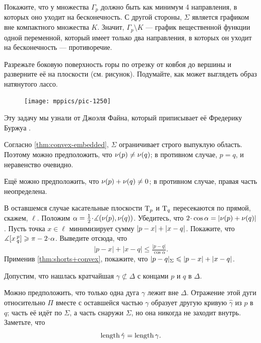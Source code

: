 \begin{multicols}{2}
Покажите, что у множества $\Gamma_p$ должно быть как минимум 4 направления, в которых оно уходит на бесконечность.
С другой стороны, $\Sigma$ является графиком вне компактного множества $K$.
Значит, $\Gamma_p\setminus K$ --- график вещественной функции одной переменной, который имеет только два направления, в которых он уходит на бесконечность --- противоречие.


\setcounter{eqtn}{0}

Разрежьте боковую поверхность горы по отрезку от ковбоя до вершины и
разверните её на плоскости (см. рисунок).
Подумайте, как может выглядеть образ натянутого лассо.

\begin{figure}
\vskip-4mm
\centering
\texttt{[image: mppics/pic-1250]}
\vskip-4mm
\end{figure}

Эту задачу мы узнали от Джоэля Файна, который приписывает её Фредерику Буржуа \cite{fine}.

Согласно \ref{thm:convex-embedded}, $\Sigma$ ограничивает строго выпуклую область.
Поэтому можно предположить, что $\nu(p)\ne\nu(q)$; в противном случае, $p=q$, и неравенство очевидно.

Ещё можно предположить, что $\Norm(p)\z+\Norm(q)\z\ne 0$; в противном случае, правая часть неопределена.

В оставшемся случае касательные плоскости $\mathrm{T}_p$ и $\mathrm{T}_q$ пересекаются по прямой, скажем, $\ell$.
Положим $\alpha=\tfrac12\cdot\measuredangle(\Norm(p),\Norm(q))$.
Убедитесь, что $2\cdot\cos\alpha\z= |\Norm(p)+\Norm(q)|$.
Пусть точка $x\in \ell$ минимизирует сумму $|p-x|\z+|x-q|$.
Покажите, что $\measuredangle\hinge xpq\ge \pi-2\cdot\alpha$.
Выведите отсюда, что 
\[
|p-x|+|x-q|\le \tfrac{|p-q|}{\cos\alpha}.
\]
Применив \ref{thm:shorts+convex}, покажите, что
$\dist{p}{q}\Sigma\z\le |p-x|\z+|x-q|$.

Допустим, что нашлась кратчайшая $\gamma\not\subset\Delta$ с концами $p$ и $q$ в $\Delta$.

Можно предположить, что только одна дуга $\gamma$ лежит вне $\Delta$.
Отражение этой дуги относительно $\Pi$ вместе с оставшейся частью $\gamma$ образует другую кривую $\hat\gamma$ из $p$ в $q$;
часть её идёт по $\Sigma$, 
а часть снаружи $\Sigma$,
но она никогда не заходит внутрь.
Заметьте, что
\[\mathop{\rm length}\nolimits\hat\gamma=\mathop{\rm length}\nolimits\gamma.\]


\end{multicols}
